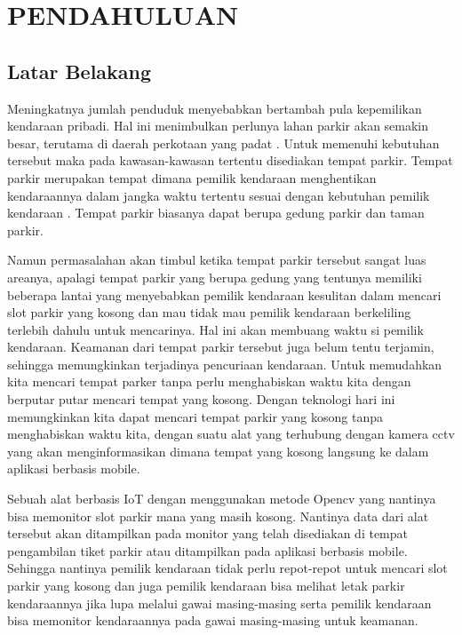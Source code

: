 \chapter{PENDAHULUAN}


\section{Latar Belakang}
\par Meningkatnya jumlah penduduk menyebabkan bertambah pula kepemilikan kendaraan pribadi\cite{supriono2015evaluasi}. Hal ini menimbulkan perlunya lahan parkir akan semakin besar, terutama di daerah perkotaan yang padat \cite{supriono2015evaluasi}. Untuk memenuhi kebutuhan tersebut maka pada  kawasan-kawasan tertentu disediakan tempat parkir. Tempat parkir merupakan tempat dimana pemilik kendaraan menghentikan kendaraannya dalam jangka waktu tertentu sesuai dengan kebutuhan pemilik kendaraan \cite{kurniawan2017analisis}. Tempat parkir biasanya dapat berupa gedung parkir dan taman parkir\cite{kurniawan2017analisis}.
\par Namun permasalahan akan timbul ketika tempat parkir tersebut sangat luas areanya, apalagi tempat parkir yang berupa gedung yang tentunya memiliki beberapa lantai yang menyebabkan pemilik kendaraan kesulitan dalam mencari slot parkir yang kosong dan mau tidak mau pemilik kendaraan berkeliling terlebih dahulu untuk mencarinya\cite{danisia2017prototipe}. Hal ini akan membuang waktu si pemilik kendaraan. Keamanan dari tempat parkir tersebut juga belum tentu terjamin, sehingga memungkinkan terjadinya pencuriaan kendaraan\cite{fais2014pengembangan}. Untuk memudahkan kita mencari tempat parker tanpa perlu menghabiskan waktu kita dengan berputar putar mencari tempat yang kosong. Dengan teknologi hari ini memungkinkan kita dapat mencari tempat parkir yang kosong tanpa menghabiskan waktu kita, dengan suatu alat yang terhubung dengan kamera cctv yang akan menginformasikan dimana tempat yang kosong langsung ke dalam aplikasi berbasis mobile\cite{fraifer2016designing}.
\par Sebuah alat berbasis IoT dengan menggunakan metode Opencv yang nantinya bisa memonitor slot parkir mana yang masih kosong. Nantinya data dari alat tersebut akan ditampilkan pada monitor yang telah disediakan di tempat pengambilan tiket parkir atau ditampilkan pada aplikasi berbasis mobile. Sehingga nantinya pemilik kendaraan tidak perlu repot-repot untuk mencari slot parkir yang kosong dan juga pemilik kendaraan bisa melihat letak parkir kendaraannya jika lupa melalui gawai masing-masing serta pemilik kendaraan bisa memonitor kendaraannya pada gawai masing-masing untuk keamanan\cite{fais2014pengembangan}.


